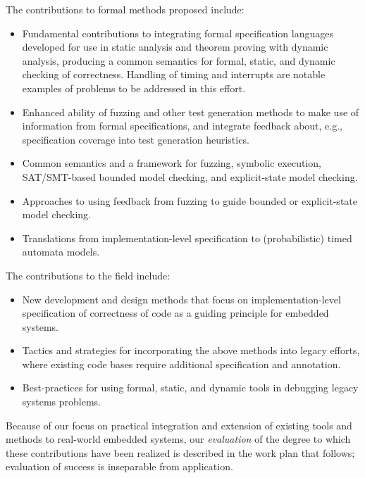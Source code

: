 The contributions to formal methods proposed include:

\begin{itemize}
\item Fundamental contributions to integrating formal specification
languages developed for use in static analysis and theorem proving
with dynamic analysis, producing a common semantics for formal,
static, and dynamic checking of correctness.  Handling of timing and
interrupts are notable examples of problems to be addressed in this effort.
\item Enhanced ability of fuzzing and other test generation methods to
make use of information from formal specifications, and integrate
feedback about, e.g., specification coverage into test generation
heuristics.
\item Common semantics and a framework for fuzzing, symbolic execution, SAT/SMT-based
bounded model checking, and explicit-state model checking.
\item Approaches to using feedback from fuzzing to guide bounded or explicit-state model
checking.
\item Translations from implementation-level specification to
(probabilistic) timed automata models.
\end{itemize}

The contributions to the field include:

\begin{itemize}
\item New development and design methods that focus on
implementation-level specification of correctness of code as a guiding
principle for embedded systems.
\item Tactics and strategies for incorporating the above methods into
legacy efforts, where existing code bases require additional
specification and annotation.
\item Best-practices for using formal, static, and dynamic tools in
debugging legacy systems problems.
\end{itemize}


Because of our focus on practical integration and extension of
existing tools and methods to real-world embedded systems,
our \emph{evaluation} of the degree to which these contributions have
been realized is described in the work plan that follows; evaluation
of success is inseparable from application.